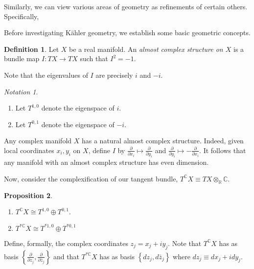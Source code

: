 \documentclass[10pt,letterpaper,cm]{nupset}
\theoremstyle{definition}
\newtheorem{defn}{Definition}[subsection]
\theoremstyle{theorem}
\newtheorem{prop}[defn]{Proposition}
\theoremstyle{remark}
\newtheorem*{notation}{Notation}
\newcommand{\C}{\mathbb C}
\newcommand{\R}{\mathbb{R}}
\newcommand{\1}{\mathbb{1}}
\newcommand{\0}{\vec 0}
\newcommand{\be}{\begin{enumerate}}
\newcommand{\ee}{\end{enumerate}}
\begin{document}
Similarly, we can view various areas of geometry as refinements of certain others. Specifically,

\begin{center}
\end{center}

Before investigating K\"ahler geometry, we establish some basic geometric concepts.

\begin{defn}
Let  $X$ be a real manifold. An \textit{almost complex structure on $X$} is a bundle map $I : T{X} \to T{X}$ such that $I^2 = {-1}$.
\end{defn}

Note that the eigenvalues of $I$ are precisely $i$ and ${-i}$.

\begin{notation} $ $
\be
\item Let $T^{1,0}$ denote the eigenspace of $i$.
\item  Let $T^{0,1}$ denote the eigenspace of ${-i}$.
\ee
\end{notation}

Any complex manifold $X$ has a natural almost complex structure. Indeed, given local coordinates $x_i, y_i$ on $X$, define $I$ by $\frac{\partial}{\partial{x_i}} \mapsto \frac{\partial}{\partial{y_i}}$ and $\frac{\partial}{\partial{y_i}} \mapsto {-\frac{\partial}{\partial{x_i}}}$. It follows that any manifold with an almost complex structure has even dimension.

\medskip

Now, consider the  complexification of our tangent bundle, $T^{\C}{X} \equiv T{X} \otimes_{\R}\C$.  

\begin{prop} $ $
\be
\item $T^{\C}{X} \cong T^{1,0} \oplus T^{0,1}$.
\item $T^{\ast{\C}}{X} \cong T^{\ast{1,0}}\oplus T^{\ast{0,1}}$
\ee
\end{prop}

Define, formally, the complex coordinates $z_j = x_j + iy_j$. Note that $T^{\C}{X}$ has as basis $\left\{\frac{\partial}{\partial{z_j}}, \frac{\partial}{\partial{\bar{z}_j}}\right\}$ and that $T^{\ast{\C}}{X}$ has as basis $\left\{d{z_j}, d{\bar{z}_j}\right\}$ where $d{z_j} \equiv d{x_j} + id{y_j}$.
\end{document}
